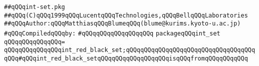 \label{src/app/makelib/stuff/int-set.pkg}
\verb|##qQQqint-set.pkg|\newline
\verb|##qQQq(C)qQQq1999qQQqLucentqQQqTechnologies,qQQqBellqQQqLaboratories|\newline
\verb|##qQQqAuthor:qQQqMatthiasqQQqBlumeqQQq(blume@kurims.kyoto-u.ac.jp)|\newline
\newline
\verb|#qQQqCompiledqQQqby:|\newline
\verb|#qQQqqQQqqQQqqQQqqQQq|\newline
\newline
\newline
\verb|packageqQQqint_set|\newline
\verb|qQQqqQQqqQQqqQQq=|\newline
\verb|qQQqqQQqqQQqqQQqint_red_black_set;qQQqqQQqqQQqqQQqqQQqqQQqqQQqqQQqqQQqqQQq#qQQqint_red_black_setqQQqqQQqqQQqqQQqqQQqisqQQqfromqQQqqQQqqQQq|\newline

